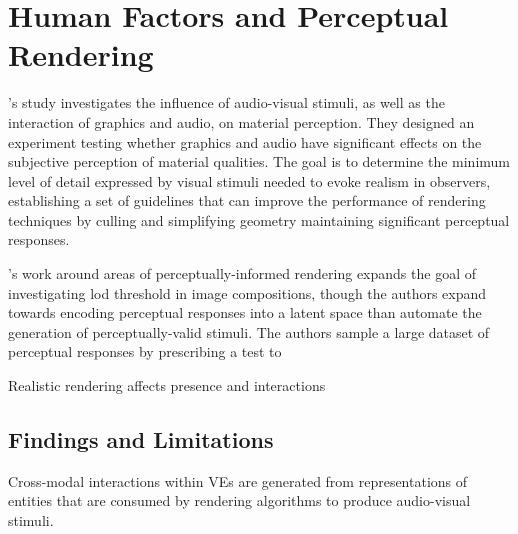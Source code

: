 \section{Human Factors and Perceptual Rendering}
\cite{bonneel2010bimodal}'s study investigates the influence of audio-visual stimuli, as well as the interaction of graphics and audio, on material perception. They designed an experiment testing whether graphics and audio have significant effects on the subjective perception of material qualities. The goal is to determine the minimum level of detail expressed by visual stimuli needed to evoke realism in observers, establishing a set of guidelines that can improve the performance of rendering techniques by culling and simplifying geometry maintaining significant perceptual responses.

\cite{Dolhasz_2020_CVPR}'s work around areas of perceptually-informed rendering expands the goal of investigating \acrshort{lod} threshold in image compositions, though the authors expand towards encoding perceptual responses into a latent space than automate the generation of perceptually-valid stimuli. The authors sample a large dataset of perceptual responses by prescribing a test to 

\cite{slater2009visual} Realistic rendering affects presence and interactions

\subsection{Findings and Limitations}
Cross-modal interactions within VEs are generated from representations of entities that are consumed by rendering algorithms to produce audio-visual stimuli. 


